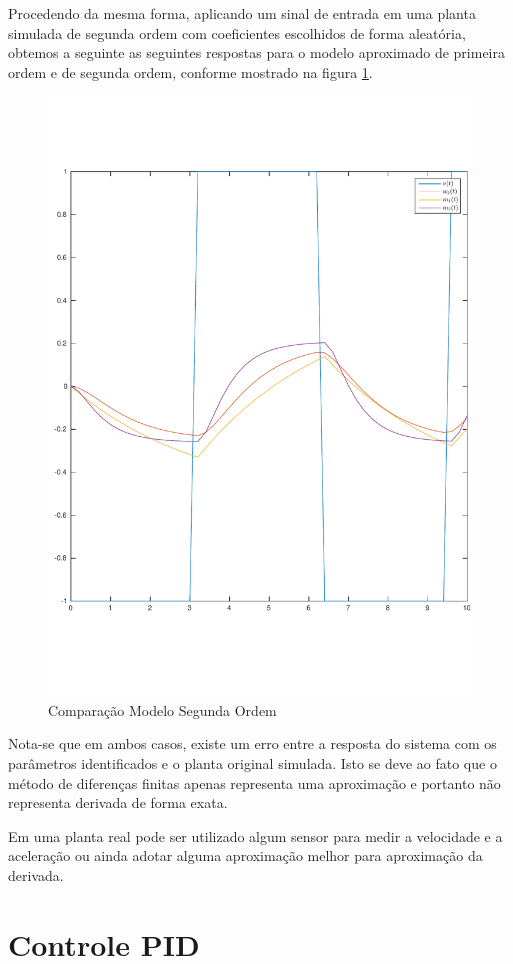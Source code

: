 \documentclass[a4paper,11pt]{article}
\begin{document}
Procedendo da mesma forma, aplicando um sinal de entrada em uma planta simulada de segunda ordem com coeficientes escolhidos de forma aleatória, obtemos a seguinte as seguintes respostas para o modelo aproximado de primeira ordem e de segunda ordem, conforme mostrado na figura \ref{fig:model2Evaluation}.

\begin{figure}[H]
    \centering
    \includegraphics[width=0.6\linewidth]{tex/img/model2Evaluation.pdf}
    \caption{Comparação Modelo Segunda Ordem}
    \label{fig:model2Evaluation}
\end{figure}

Nota-se que em ambos casos, existe um erro entre a resposta do sistema com os parâmetros identificados e o planta original simulada. Isto se deve ao fato que o método de diferenças finitas apenas representa uma aproximação e portanto não representa derivada de forma exata.

Em uma planta real pode ser utilizado algum sensor para medir a velocidade e a aceleração ou ainda adotar alguma aproximação melhor para aproximação da derivada.






\section{Controle PID}
\end{document}
